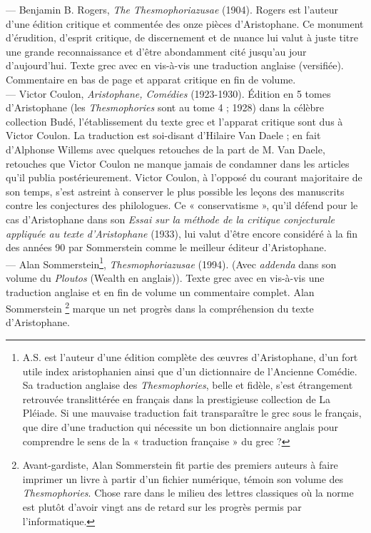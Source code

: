 \documentclass{book}%
\newcommand{\italique}[1]{\textit{#1}}%
\newcommand{\anglais}[1]{{\policeAn \scriptsize{#1}}}%
\newcommand{\note}[1]{\footnote{#1}}
\begin{document}
--- Benjamin B. Rogers, \italique{The Thesmophoriazusae} (1904). Rogers est l'auteur d'une édition critique et commentée des onze pièces d'Aristophane. Ce monument d'érudition, d'esprit critique, de discernement et de nuance lui valut à juste titre une grande reconnaissance et d'être abondamment cité jusqu'au jour d'aujourd'hui. Texte grec avec en vis-à-vis une traduction anglaise (versifiée). Commentaire en bas de page et apparat critique en fin de volume.\\

--- Victor Coulon, \italique{Aristophane, Comédies} (1923-1930). Édition en 5 tomes d’Aristophane (les \italique{Thesmophories} sont au tome 4 ; 1928) dans la célèbre collection Budé, l’établissement du texte grec et l’apparat critique sont dus à Victor Coulon. La traduction est soi-disant d’Hilaire Van Daele ; en fait d’Alphonse Willems avec quelques retouches de la part de M. Van Daele, retouches que Victor Coulon ne manque jamais de condamner dans les articles qu’il publia postérieurement. Victor Coulon, à l’opposé du courant majoritaire de son temps, s’est astreint à conserver le plus possible les leçons des manuscrits contre les conjectures des philologues. Ce « conservatisme », qu’il défend pour le cas d’Aristophane dans son \italique{Essai sur la méthode de la critique conjecturale appliquée au texte d’Aristophane} (1933), lui valut d’être encore considéré à la fin des années 90 par Sommerstein comme le meilleur éditeur d’Aristophane. \\


--- Alan Sommerstein\note{A.S. est l'auteur d’une édition complète des œuvres d’Aristophane, d’un fort utile index aristophanien ainsi que d’un dictionnaire de l’Ancienne Comédie. Sa traduction anglaise des \italique{Thesmophories}, belle et fidèle, s’est étrangement retrouvée translittérée en français dans la prestigieuse collection de La Pléiade. Si une mauvaise traduction fait transparaître le grec sous le français, que dire d’une traduction qui nécessite un bon dictionnaire anglais pour comprendre le sens de la « traduction française » du grec ?}, \italique{Thesmophoriazusae} (1994). (Avec \italique{addenda} dans son volume du \italique{Ploutos} (\anglais{Wealth} en anglais)). Texte grec avec en vis-à-vis une traduction anglaise et en fin de volume un commentaire complet. Alan Sommerstein \note{Avant-gardiste, Alan Sommerstein fit partie des premiers auteurs à faire imprimer un livre à partir d'un fichier numérique, témoin son volume des \italique{Thesmophories}. Chose rare dans le milieu des lettres classiques où la norme est plutôt d'avoir vingt ans de retard sur les progrès permis par l'informatique.} marque un net progrès dans la compréhension du texte d'Aristophane.\\
\end{document}
